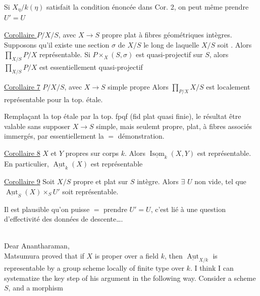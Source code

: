 Si $X_\eta/k(\eta)$ satisfait la condition énoncée dans Cor. 2, on peut même prendre $U'=U$

\uline{Corollaire } $P/X/S$, avec $X\longrightarrow S$ propre plat à fibres géométriques intègres. Supposons qu'il existe une section $\sigma$ de $X/S$ le long de laquelle $X/S$ soit . Alors $\prod_{X/S}P/X$ représentable. Si $P\times_X(S,\sigma)$ est quasi-projectif sur $S$, alors $\prod_{X/S}P/X$ est essentiellement quasi-projectif

\uline{Corollaire 7} $P/X/S$, avec $X\to S$ simple propre   Alors $\prod_{P/X}X/S$ est localement représentable pour la top. étale.

Remplaçant la top étale par la top. fpqf (fid plat quasi finie), le résultat   être valable sans supposer $X\to S$ simple, mais seulemt propre, plat, à fibres  associés immergés, par essentiellement la $=$ démonstration.

\uline{Corollaire 8} $X$ et $Y$ propres sur  corps $k$. Alors $\underline{\operatorname{Isom}}_k(X,Y)$ est représentable. En particulier, $\underline{\operatorname{Aut}}_k(X)$ est représentable

\uline{Corollaire 9} Soit $X/S$ propre et plat sur $S$  intègre. Alors $\exists$ $U$ non vide,  tel que $\underline{\operatorname{Aut}}_S(X)\times_S U'$ soit représentable.

Il est plausible qu'on puisse $=$ prendre $U'=U$, c'est lié à une question d'effectivité des données de descente\ldots.



\\

Dear Anantharaman,\\

Matsumura proved that if $X$ is proper over a field $k$, then $\underline{\operatorname{Aut}}_{X/k}$ is representable by a group scheme locally of finite type over $k$. I think I can systematize the key step of his argument in the following way. Consider a scheme $S$, and a morphism

